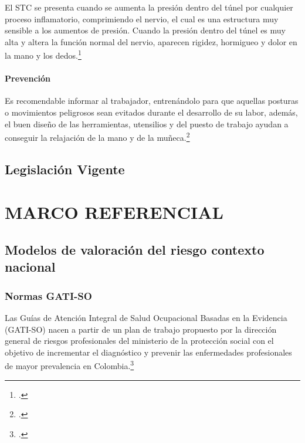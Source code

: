 El STC se presenta cuando se aumenta la presión dentro del túnel por cualquier proceso inflamatorio, comprimiendo el nervio, el cual es una estructura muy sensible a los aumentos de presión. Cuando la presión dentro del túnel es muy alta y altera la función normal del nervio, aparecen rigidez, hormigueo y dolor en la mano y los dedos.\footcite{SindromeCarpiano}
\paragraph{Prevención}
Es recomendable informar al trabajador, entrenándolo para que aquellas posturas o movimientos peligrosos sean evitados durante el desarrollo de su labor, además, el buen diseño de las herramientas, utensilios y del puesto de trabajo ayudan a conseguir la relajación de la mano y de la muñeca.\footcite{SindromeTratarlo}
\subsection{Legislación Vigente}
\section{MARCO REFERENCIAL}
\subsection{Modelos de valoración del riesgo  contexto nacional}
\subsubsection{Normas GATI-SO}
Las Guías de Atención Integral de Salud Ocupacional Basadas en la Evidencia (GATI-SO) nacen a partir de un plan de trabajo propuesto por la dirección general de riesgos profesionales del ministerio de la protección social con el objetivo de incrementar el diagnóstico y prevenir las enfermedades profesionales de
mayor prevalencia en Colombia.\footcite[6]{MinisterioCONTINUA}


